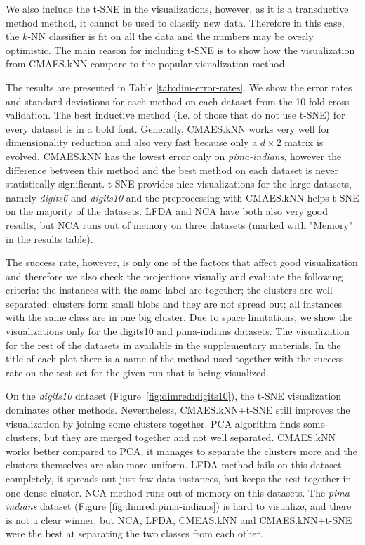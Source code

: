 We also include the t-SNE in the visualizations, however, as it is a transductive method method, it cannot be used to classify new data. Therefore in this case, the $k$-NN classifier is fit on all the data and the numbers may be overly optimistic. The main reason for including t-SNE is to show how the visualization from CMAES.kNN compare to the popular visualization method.

The results are presented in Table \ref{tab:dim-error-rates}. We show the error rates and standard deviations for each method on each dataset from the 10-fold cross validation. The best inductive method (i.e. of those that do not use t-SNE) for every dataset is in a bold font. Generally, CMAES.kNN works very well for dimensionality reduction and also very fast because only a $d\times2$ matrix is evolved. CMAES.kNN has the lowest error only on \textit{pima-indians}, however the difference between this method and the best method on each dataset is never statistically significant. t-SNE provides nice visualizations for the large datasets, namely \textit{digits6} and \textit{digits10} and the preprocessing with CMAES.kNN helps t-SNE on the majority of the datasets. LFDA and NCA have both also very good results, but NCA runs out of memory on three datasets (marked with "Memory" in the results table).



The success rate, however, is only one of the factors that affect good visualization and therefore we also check the projections visually and evaluate the following criteria: the instances with the same label are together; the clusters are well separated; clusters form small blobs and they are not spread out; all instances with the same class are in one big cluster. Due to space limitations, we show the visualizations only for the digits10 and pima-indians datasets. The visualization for the rest of the datasets in available in the supplementary materials. In the title of each plot there is a name of the method used together with the success rate on the test set for the given run that is being visualized. 

On the \textit{digits10} dataset (Figure~\ref{fig:dimred:digits10}), the t-SNE visualization dominates other methods. Nevertheless, CMAES.kNN+t-SNE still improves the visualization by joining some clusters together. PCA algorithm finds some clusters, but they are merged together and not well separated. CMAES.kNN works better compared to PCA, it manages to separate the clusters more and the clusters themselves are also more uniform. LFDA method fails on this dataset completely, it spreads out just few data instances, but keeps the rest together in one dense cluster. NCA method runs out of memory on this datasets. The \textit{pima-indians} dataset (Figure \ref{fig:dimred:pima-indians}) is hard to visualize, and there is not a clear winner, but NCA, LFDA, CMEAS.kNN and CMAES.kNN+t-SNE were the best at separating the two classes from each other.

